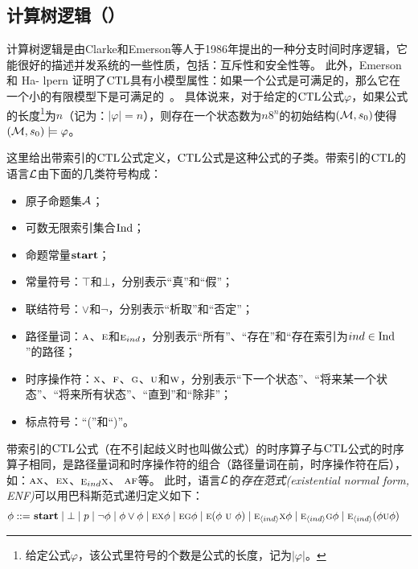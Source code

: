 \subsection{计算树逻辑（\CTL）}
计算树逻辑是由Clarke和Emerson等人于1986年提出的一种分支时间时序逻辑\cite{DBLP:journals/toplas/ClarkeES86}，它能很好的描述并发系统的一些性质，包括：互斥性和安全性等。
此外，Emerson和 Ha- lpern 证明了$\textrm{CTL}$具有小模型属性：如果一个公式是可满足的，那么它在一个小的有限模型下是可满足的~\cite{DBLP:journals/jcss/EmersonH85}。
具体说来，对于给定的$\textrm{CTL}$公式$\varphi$，如果公式的长度\footnote{给定公式$\varphi$，该公式里符号的个数是公式的长度，记为$|\varphi|$。}为$n$（记为：$|\varphi| = n$），则存在一个状态数为$n8^n$的初始结构$({\cal M},s_0)$使得$({\cal M},s_0)\models \varphi$。

这里给出带索引的$\textrm{CTL}$公式定义，$\textrm{CTL}$公式是这种公式的子类。带索引的$\textrm{CTL}$的语言${\cal L}$由下面的几类符号构成：
\begin{itemize}
	\item 原子命题集${\cal A}$；
	\item 可数无限索引集合$\textrm{Ind}$；
	\item 命题常量$\textbf{start}$；
	\item 常量符号：$\top$和$\bot$，分别表示“真”和“假”；
	\item 联结符号：$\vee$和$\neg$，分别表示“析取”和“否定”；
	\item 路径量词：$\textsc{a}$、$\textsc{e}$和$\textsc{e}_{ind}$，分别表示“所有”、“存在”和“存在索引为$ind\in \textrm{Ind}$”的路径；
	\item 时序操作符：$\textsc{x}$、$\textsc{f}$、$\textsc{g}$、$\textsc{u}$和$\textsc{w}$，分别表示“下一个状态”、“将来某一个状态”、“将来所有状态”、“直到”和“除非”；
	\item 标点符号：“(”和“)”。
\end{itemize}
带索引的$\textrm{CTL}$公式（在不引起歧义时也叫做公式）的时序算子与$\textrm{CTL}$公式的时序算子相同，是路径量词和时序操作符的组合（路径量词在前，时序操作符在后），如：$\textsc{a} \textsc{x}$、$\textsc{e} \textsc{x}$、$\textsc{e}_{ind} \textsc{x}$、 $\textsc{a} \textsc{f}$等。
此时，语言$\cal L$的\emph{存在范式(existential normal form, ENF)}可以用巴科斯范式递归定义如下：
	\begin{align*}
	\phi  ::= & \ \start\mid \bot %
	\mid p \mid\neg\phi \mid \phi\lor\phi \mid
	\EXIST \NEXT \phi \mid
	\EXIST \GLOBAL \phi \mid
	\EXIST (\phi\ \UNTILL\ \phi)\mid
	\EXIST_{\tuple{ind}}\NEXT \phi  \mid
	\EXIST_{\tuple{ind}}\GLOBAL \phi \mid
	\EXIST_{\tuple{ind}}(\phi \UNTILL \phi) %
\end{align*}

